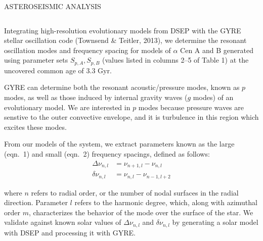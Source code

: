 \documentclass[final,t]{beamer}
\begin{document}
\begin{frame}{}
\begin{columns}[t]
\begin{column}{.48\linewidth}
\begin{block}{\centering ASTEROSEISMIC ANALYSIS}%
\begin{columns}[T]
    \begin{column}{0.8\linewidth}
    {\small
    Integrating high-resolution evolutionary models from DSEP with the \alert{GYRE} stellar oscillation code (Townsend \& Teitler, 2013), we determine the resonant oscillation modes and frequency spacing for models of $\alpha$ Cen A and B generated using  parameter sets $S_{p,A}, S_{p,B}$ (values listed in columns 2--5 of Table 1) at the uncovered common age of 3.3 Gyr.
   
    GYRE can determine both the resonant acoustic/pressure modes, known as $p$ modes, as well as those induced by internal gravity waves ($g$ modes) of an evolutionary model. We are interested in $p$ modes because pressure waves are senstive to the outer convective envelope, and it is turbulence in this region which excites these modes. 
    
    From our models of the system, we extract parameters known as the large (eqn.\ 1) and small (eqn.\ 2) frequency spacings, defined as follows:
    \begin{align}
    \Delta \nu_{n,l} &= \nu_{n+1,l} - \nu_{n,l}
    \\
    \delta \nu_{n,l} &= \nu_{n,l} - \nu_{n-1,l+2}
    \end{align}

    where $n$ refers to \alert{radial order}, or the number of nodal surfaces in the radial direction. Parameter $l$ refers to the \alert{harmonic degree}, which, along with azimuthal order $m$, characterizes the behavior of the mode over the surface of the star.  
    We validate against known solar values of $\Delta \nu_{n,l}$ and $\delta \nu_{n,l}$ by generating a solar model with DSEP and processing it with GYRE. 
}

    \end{column}

    \begin{column}{0.19\linewidth}
        \centering
        \texttt{[image: \{pvsg]}.png}


\end{column}
\end{columns}
\end{block}
\end{column}
\end{columns}
\end{frame}
\end{document}
